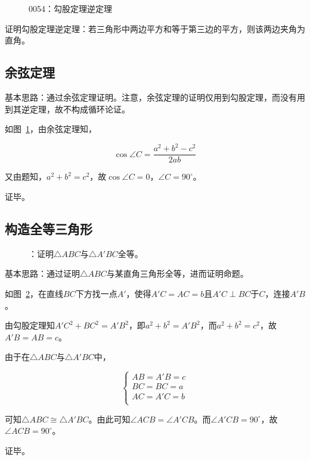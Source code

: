 

\begin{figure}[htbp]
  \centering
  \caption{0054：勾股定理逆定理} \label{fig:0054}
\end{figure}

证明勾股定理逆定理：若三角形中两边平方和等于第三边的平方，则该两边夹角为直角。

\subsection{余弦定理}

基本思路：通过余弦定理证明。注意，余弦定理的证明仅用到勾股定理，而没有用到其逆定理，故不构成循环论证。

如图~\ref{fig:0054}，由余弦定理知，

\[ \cos\angle C = \frac{a^2 + b^2 - c^2}{2ab} \]

又由题知，$a^2 + b^2 = c^2$，故$\cos\angle C = 0$，$\angle C = 90^\circ$。

证毕。

\subsection{构造全等三角形} \label{subsec:0054-eqtri}

\begin{figure}[htbp]
  \centering
  \caption{：证明$\triangle ABC$与$\triangle A'BC$全等。}
  \label{fig:0054-eqtri}
\end{figure}

基本思路：通过证明$\triangle ABC$与某直角三角形全等，进而证明命题。

如图~\ref{fig:0054-eqtri}，在直线$BC$下方找一点$A'$，使得$A'C = AC = b$且$A'C \perp BC$于$C$，连接$A'B$。

由勾股定理知$A'C^2 + BC^2 = A'B^2$，即$a^2 + b^2 = A'B^2$，而$a^2 + b^2 = c^2$，故$A'B = AB = c$。

由于在$\triangle ABC$与$\triangle A'BC$中，

\[ \begin{cases}
  AB = A'B = c \\
  BC = BC = a \\
  AC = A'C = b \\
\end{cases} \]

可知$\triangle ABC \cong \triangle A'BC$。由此可知$\angle ACB = \angle A'CB$。而$\angle A'CB = 90^\circ$，故$\angle ACB = 90^\circ$。

证毕。
